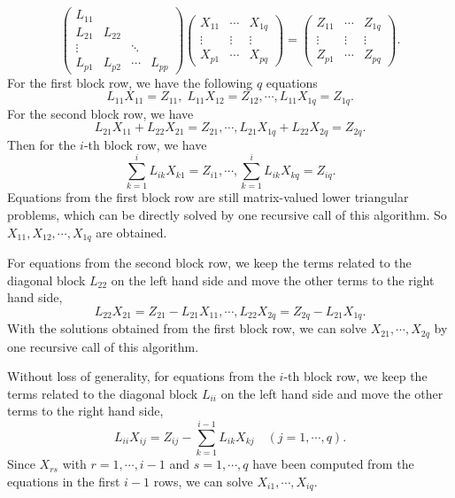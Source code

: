 \documentclass[11pt, a4paper]{book}
\begin{document}
\begin{itemize}
\begin{equation}
    \begin{pmatrix}
      L_{11} & & & \\
      L_{21} & L_{22} & & \\
      \vdots & & \ddots & \\
      L_{p1} & L_{p2} & \cdots & L_{pp}
    \end{pmatrix}
    \begin{pmatrix}
      X_{11} & \cdots & X_{1q} \\
      \vdots & \vdots & \vdots \\
      X_{p1} & \cdots & X_{pq}
    \end{pmatrix} =
    \begin{pmatrix}
      Z_{11} & \cdots & Z_{1q} \\
      \vdots & \vdots & \vdots \\
      Z_{p1} & \cdots & Z_{pq}
    \end{pmatrix}.
  \end{equation}
  For the first block row, we have the following $q$ equations
  \begin{equation*}
    L_{11}X_{11} = Z_{11},\; L_{11}X_{12} = Z_{12}, \cdots, L_{11}X_{1q} = Z_{1q}.
  \end{equation*}
  For the second block row, we have
  \begin{equation*}
    L_{21}X_{11} + L_{22}X_{21} = Z_{21}, \cdots, L_{21}X_{1q} + L_{22}X_{2q} = Z_{2q}.
  \end{equation*}
  Then for the $i$-th block row, we have
  \begin{equation*}
    \sum_{k=1}^{i} L_{ik}X_{k1} = Z_{i1}, \cdots, \sum_{k=1}^i L_{ik}X_{kq} = Z_{iq}.
  \end{equation*}
  Equations from the first block row are still matrix-valued lower triangular problems,
  which can be directly solved by one recursive call of this algorithm. So
  $X_{11}, X_{12}, \cdots, X_{1q}$ are obtained.

  For equations from the second block row, we keep the terms related to the diagonal block
  $L_{22}$ on the left hand side and move the other terms to the right hand side,
  \begin{equation*}
    L_{22}X_{21} = Z_{21} - L_{21}X_{11}, \cdots, L_{22}X_{2q} = Z_{2q} - L_{21}X_{1q}.
  \end{equation*}
  With the solutions obtained from the first block row, we can solve
  $X_{21}, \cdots, X_{2q}$ by one recursive call of this algorithm.

  Without loss of generality, for equations from the $i$-th block row, we keep the terms
  related to the diagonal block $L_{ii}$ on the left hand side and move the other terms to
  the right hand side,
  \begin{equation*}
    L_{ii}X_{ij} = Z_{ij} - \sum_{k=1}^{i-1} L_{ik}X_{kj} \quad (j=1,\cdots,q).
  \end{equation*}
  Since $X_{rs}$ with $r=1,\cdots,i-1$ and $s=1,\cdots,q$ have been computed from the
  equations in the first $i-1$ rows, we can solve $X_{i1}, \cdots, X_{iq}$.
\end{itemize}
\end{document}
